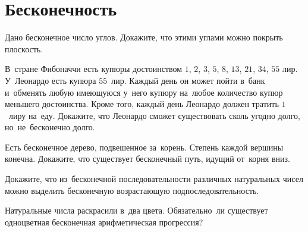 
\section*{Бесконечность}


\begin{problems}

\item
Дано бесконечное число углов.
Докажите, что этими углами можно покрыть плоскость.

\item
В~стране Фибоначчи есть купюры достоинством
$1$, $2$, $3$, $5$, $8$, $13$, $21$, $34$, $55$ лир.
У~Леонардо есть купюра $55$~лир.
Каждый день он может пойти в~банк и~обменять любую имеющуюся у~него купюру
на~любое количество купюр меньшего достоинства.
Кроме того, каждый день Леонардо должен тратить $1$~лиру на~еду.
Докажите, что Леонардо сможет существовать сколь угодно долго, но~не~бесконечно
долго.

\item
Есть бесконечное дерево, подвешенное за~корень.
Степень каждой вершины конечна.
Докажите, что существует бесконечный путь, идущий от~корня вниз.

\item
Докажите, что из~бесконечной последовательности различных натуральных чисел
можно выделить бесконечную возрастающую подпоследовательность.

\item
Натуральные числа раскрасили в~два цвета.
Обязательно~ли существует одноцветная бесконечная арифметическая прогрессия?

\end{problems}

